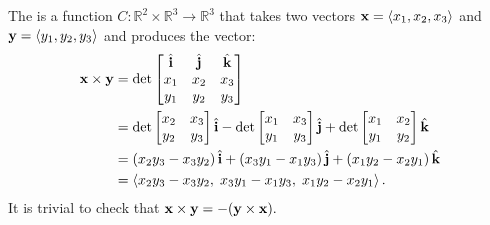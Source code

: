 \begin{dfn}
    The  is a function \( C: \mathbb{R}^{2} \times \mathbb{R}^{3} \to \mathbb{R}^{3} \) that takes two vectors \( \vb{x} = \left< x_{1}, x_{2 }, x_{3} \right> \) and \( \vb{y} = \left< y_{1 }, y_{2 }, y_{3} \right> \) and produces the vector:
    \begin{align*}
         \vb{x} \times \vb{y} &= \det \begin{bmatrix}
        \hat{\vb{i}} & \hat{\vb{j}} & \hat{\vb{k}}\\
        x_{1} & x_{2} & x_{3}\\
        y_{1} & y_{2} & y_{3}\\
    \end{bmatrix}\\ 
    &= \det \begin{bmatrix}
        x_{2 } & x_{3}\\
         y_{2} & y_{3}\\
    \end{bmatrix}  \hat{\vb{i}} - \det \begin{bmatrix}
        x_{1 } & x_{3}\\
         y_{1} & y_{3}\\
    \end{bmatrix}  \hat{\vb{j}} + \det \begin{bmatrix}
        x_{1 } & x_{2}\\
         y_{1} & y_{2}\\
    \end{bmatrix}  \hat{\vb{k}} \\
    &= \left( x_{2}y_{3} - x_{3}y_{2} \right) \hat{\vb{i}} + \left( x_{3}y_{1}-x_{1}y_{3} \right) \hat{\vb{j}} + \left( x_{1}y_{2}- x_{2}y_{1} \right) \hat{\vb{k}} \\
    &= \left< x_{2}y_{3} - x_{3}y_{2} , \;  x_{3}y_{1}-x_{1}y_{3}, \; x_{1}y_{2}- x_{2}y_{1}  \right>.
    \end{align*}
    It is trivial to check that \( \vb{x} \times  \vb{y} = - (\vb{y} \times \vb{x}). \)
\end{dfn}

